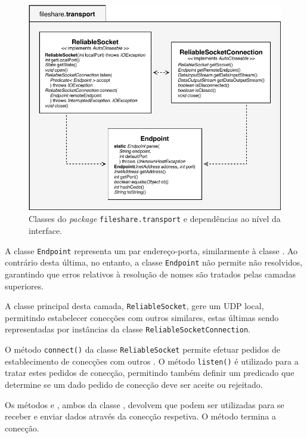 \begin{figure}[ht]
  \centering
  \includegraphics{figures/classes-transport.pdf}
  \caption{Classes do \emph{package} \texttt{fileshare.transport} e dependências ao nível da interface.}
  \label{fig:impl:classes-transport}
\end{figure}

A classe \texttt{Endpoint} representa um par endereço-porta, similarmente à classe . Ao contrário desta última, no entanto, a classe \texttt{Endpoint} não permite  não resolvidos, garantindo que erros relativos à resolução de nomes são tratados pelas camadas superiores.

A classe principal desta camada, \texttt{ReliableSocket}, gere um  UDP local, permitindo estabelecer conecções  com outros  similares, estas últimas sendo representadas por instâncias da classe \texttt{ReliableSocketConnection}.

O método \texttt{connect()} da classe \texttt{ReliableSocket} permite efetuar pedidos de establecimento de conecções com outros . O método \texttt{listen()} é utilizado para a tratar estes pedidos de conecção, permitindo também definir um predicado que determine se um dado pedido de conecção deve ser aceite ou rejeitado.

Os métodos  e , ambos da classe , devolvem  que podem ser utilizadas para se receber e enviar dados através da conecção respetiva. O método  termina a conecção.

